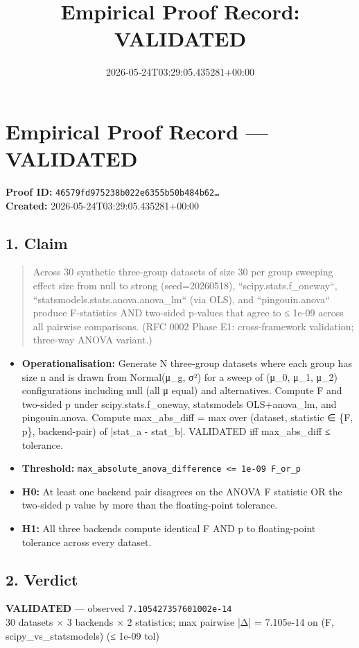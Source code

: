 \documentclass{article}
\title{Empirical Proof Record: VALIDATED}
\date{2026-05-24T03:29:05.435281+00:00}
\begin{document}
\maketitle
\section*{Empirical Proof Record --- \textcolor{validated}{\textbf{VALIDATED}}}
\textbf{Proof ID:} \texttt{46579fd975238b022e6355b50b484b62\dots}\\
\textbf{Created:} 2026-05-24T03:29:05.435281+00:00
\subsection*{1. Claim}
\begin{quote}Across 30 synthetic three-group datasets of size 30 per group sweeping effect size from null to strong (seed=20260518), ``scipy.stats.f\_oneway``, ``statsmodels.stats.anova.anova\_lm`` (via OLS), and ``pingouin.anova`` produce F-statistics AND two-sided p-values that agree to ≤ 1e-09 across all pairwise comparisons. (RFC 0002 Phase E1: cross-framework validation; three-way ANOVA variant.)\end{quote}
\begin{itemize}
\item \textbf{Operationalisation:} Generate N three-group datasets where each group has size n and is drawn from Normal(μ\_g, σ²) for a sweep of (μ\_0, μ\_1, μ\_2) configurations including null (all μ equal) and alternatives. Compute F and two-sided p under scipy.stats.f\_oneway, statsmodels OLS+anova\_lm, and pingouin.anova. Compute max\_abs\_diff = max over (dataset, statistic ∈ \{F, p\}, backend-pair) of |stat\_a - stat\_b|. VALIDATED iff max\_abs\_diff ≤ tolerance.
\item \textbf{Threshold:} \texttt{max\_absolute\_anova\_difference <= 1e-09 F\_or\_p}
\item \textbf{H0:} At least one backend pair disagrees on the ANOVA F statistic OR the two-sided p value by more than the floating-point tolerance.
\item \textbf{H1:} All three backends compute identical F AND p to floating-point tolerance across every dataset.
\end{itemize}
\subsection*{2. Verdict}
\textcolor{validated}{\textbf{VALIDATED}} --- observed \texttt{7.105427357601002e-14}\\
30 datasets × 3 backends × 2 statistics; max pairwise |Δ| = 7.105e-14 on (F, scipy\_vs\_statsmodels) (≤ 1e-09 tol)
\end{document}
